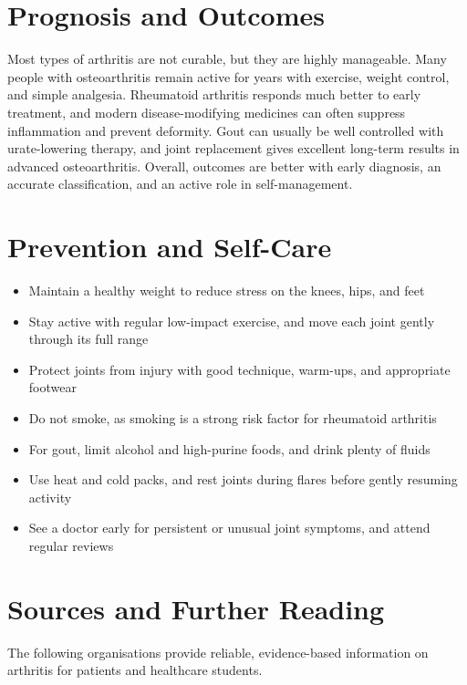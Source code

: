 \section*{Prognosis and Outcomes}
Most types of arthritis are not curable, but they are highly manageable. Many people with osteoarthritis remain active for years with exercise, weight control, and simple analgesia. Rheumatoid arthritis responds much better to early treatment, and modern disease-modifying medicines can often suppress inflammation and prevent deformity. Gout can usually be well controlled with urate-lowering therapy, and joint replacement gives excellent long-term results in advanced osteoarthritis. Overall, outcomes are better with early diagnosis, an accurate classification, and an active role in self-management.

\section*{Prevention and Self-Care}
\begin{itemize}
    \item Maintain a healthy weight to reduce stress on the knees, hips, and feet
    \item Stay active with regular low-impact exercise, and move each joint gently through its full range
    \item Protect joints from injury with good technique, warm-ups, and appropriate footwear
    \item Do not smoke, as smoking is a strong risk factor for rheumatoid arthritis
    \item For gout, limit alcohol and high-purine foods, and drink plenty of fluids
    \item Use heat and cold packs, and rest joints during flares before gently resuming activity
    \item See a doctor early for persistent or unusual joint symptoms, and attend regular reviews
\end{itemize}

\section*{Sources and Further Reading}
The following organisations provide reliable, evidence-based information on arthritis for patients and healthcare students.

